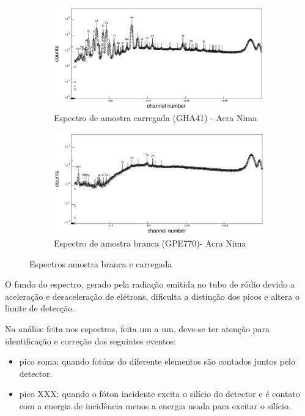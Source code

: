 \begin{figure}[H]
  \centering
  \begin{subfigure}[b]{0.7\textwidth}
    \includegraphics[width=\textwidth]{../inputs/images/winqxas/GHA41editado.pdf}
    \caption{Espectro de amostra carregada (GHA41) - Acra Nima}
  \end{subfigure}
  \begin{subfigure}[b]{0.7\textwidth}
    \includegraphics[width=\textwidth]{../inputs/images/winqxas/GPE770editado.pdf}
     \caption{Espectro de amostra branca (GPE770)- Acra Nima}
  \end{subfigure}
  \caption{Espectros amostra branca e carregada \label{fig:winqxas}}
\end{figure}

O fundo do espectro, gerado pela radiação emitida no tubo de ródio
devido a aceleração e desaceleração de elétrons, dificulta a distinção 
dos picos e altera o limite de detecção. 

Na análise feita nos espectros, feita um a um, deve-se ter atenção 
para identificação e correção dos seguintes eventos: 

\begin{itemize}
  \item pico soma: quando fotóns do diferente elementos são contados
        juntos pelo detector. 
  \item pico XXX: quando o fóton incidente excita o silício do detector
        e é contato com a energia de incidência menos a energia usada para excitar o silício. 
\end{itemize}

